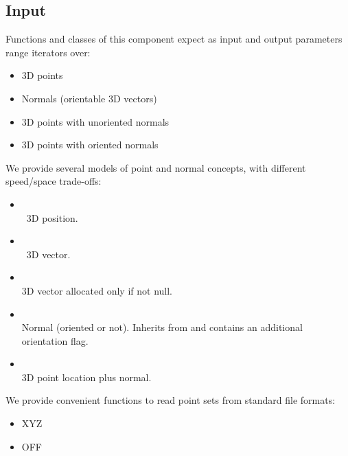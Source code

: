 \subsection{Input}

Functions and classes of this component expect as input and output parameters range iterators over:

\begin{itemize}
\item 3D points
\item Normals (orientable 3D vectors)
\item 3D points with unoriented normals
\item 3D points with oriented normals
\end{itemize}

We provide several models of point and normal concepts, with different speed/space trade-offs:

\begin{itemize}
\item {} \\
\cgal\ 3D position.
\item {} \\
\cgal\ 3D vector.
\item {} \\
3D vector allocated only if not null.
\item {} \\
Normal (oriented or not). Inherits from  and contains an additional orientation flag.
\item {} \\
3D point location plus normal.
\end{itemize}

We provide convenient functions to read point sets from standard file formats:

\begin{itemize}
\item XYZ
\item OFF
\end{itemize}

  \\
  \\

